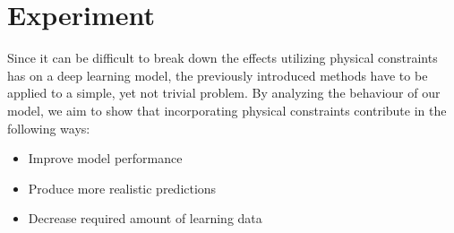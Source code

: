 \label{section:experiment}
\section{Experiment}

Since it can be difficult to break down the effects utilizing physical constraints has on a deep learning model, the previously introduced methods have to be applied to a simple, yet not trivial problem. By analyzing the behaviour of our model, we aim to show that incorporating physical constraints contribute in the following ways:
\begin{itemize}
	\item Improve model performance
	\item Produce more realistic predictions
	\item Decrease required amount of learning data
\end{itemize}

